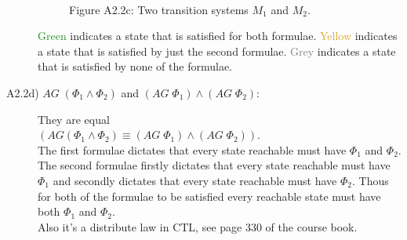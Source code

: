 \documentclass[12pt]{report}
\begin{document}
\begin{description}
\begin{figure}[H]
\begin{tabular}{ l r }
			\end{tabular}\\
			Figure A2.2c: Two transition systems $M_1$ and $M_2$.
		\end{figure}
		\textcolor{ForestGreen}{Green} indicates a state that is satisfied for both formulae. \textcolor{Goldenrod}{Yellow} indicates a state that is satisfied by just the second formulae. \textcolor{Grey}{Grey} indicates a state that is satisfied by none of the formulae.
	
	\item[A2.2d) $AG \; (\Phi_1 \wedge \Phi_2)$ and $(AG \; \Phi_1) \wedge (AG\;\Phi_2)$:]
		They are equal\\
		$\left(AG (\Phi_1 \wedge \Phi_2) \equiv (AG \; \Phi_1) \wedge (AG \;\Phi_2)\right)$.\\
		The first formulae dictates that every state reachable must have $\Phi_1$ and $\Phi_2$. The second formulae firstly dictates that every state reachable must have $\Phi_1$ and secondly dictates that every state reachable must have $\Phi_2$. Thous for both of the formulae to be satisfied every reachable state must have both $\Phi_1$ and $\Phi_2$.\\
		Also it's a distribute law in CTL, see page 330 of the course book.
		

\end{description}
\end{document}
